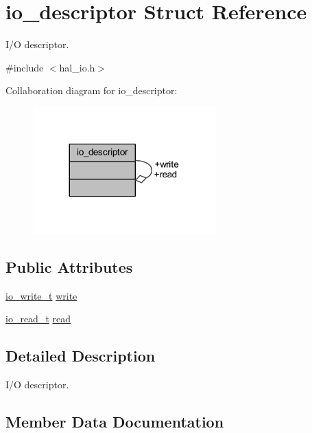 \hypertarget{structio__descriptor}{}\section{io\+\_\+descriptor Struct Reference}
\label{structio__descriptor}


I/O descriptor.  




{\ttfamily \#include $<$hal\+\_\+io.\+h$>$}



Collaboration diagram for io\+\_\+descriptor\+:\nopagebreak
\begin{figure}[H]
\begin{center}
\leavevmode
\includegraphics[width=200pt]{structio__descriptor__coll__graph}
\end{center}
\end{figure}
\subsection*{Public Attributes}
\begin{DoxyCompactItemize}
\item 
\hyperlink{group__doc__driver__hal__helper__io_gacb03c48993a6786f00946c196c40add1}{io\+\_\+write\+\_\+t} \hyperlink{structio__descriptor_a962235264b6c73e3ab712acb64022194}{write}
\item 
\hyperlink{group__doc__driver__hal__helper__io_ga4d9ae58de2887289fe09eac6f0aa8be7}{io\+\_\+read\+\_\+t} \hyperlink{structio__descriptor_a8ad97905c11dc07cd30373afc0fc146f}{read}
\end{DoxyCompactItemize}


\subsection{Detailed Description}
I/O descriptor. 

\subsection{Member Data Documentation}
\mbox{\label{structio__descriptor_a8ad97905c11dc07cd30373afc0fc146f}} 
